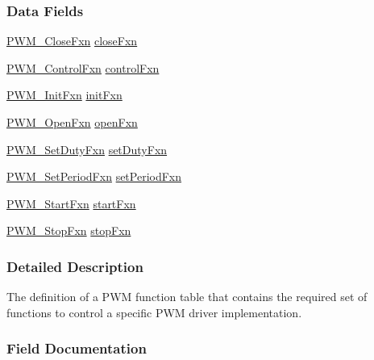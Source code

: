 \subsubsection*{Data Fields}
\begin{DoxyCompactItemize}
\item 
\hyperlink{_p_w_m_8h_a1643d365dfa900197b324ea74035d2ec}{P\+W\+M\+\_\+\+Close\+Fxn} \hyperlink{struct_p_w_m___fxn_table_a1d6e6575c66ae470f23dc2f40e54706c}{close\+Fxn}
\item 
\hyperlink{_p_w_m_8h_af538c912f876c434c62e7e0e28d41b75}{P\+W\+M\+\_\+\+Control\+Fxn} \hyperlink{struct_p_w_m___fxn_table_af96cd80b3f63291664e9268cd7a30cbc}{control\+Fxn}
\item 
\hyperlink{_p_w_m_8h_a38666ae4b117b81d35758258012b251a}{P\+W\+M\+\_\+\+Init\+Fxn} \hyperlink{struct_p_w_m___fxn_table_aebcde91c512c962f100d13f511789254}{init\+Fxn}
\item 
\hyperlink{_p_w_m_8h_a16b7b446398f8b90e4fa287c6e4a0981}{P\+W\+M\+\_\+\+Open\+Fxn} \hyperlink{struct_p_w_m___fxn_table_aca1bd99df949b2e0121ff90598279441}{open\+Fxn}
\item 
\hyperlink{_p_w_m_8h_a052016271d09bd468dddff3168dd46de}{P\+W\+M\+\_\+\+Set\+Duty\+Fxn} \hyperlink{struct_p_w_m___fxn_table_a766700e0a02097f9fd2d332b71082605}{set\+Duty\+Fxn}
\item 
\hyperlink{_p_w_m_8h_a11f62a9fd14169856c477ce2fbe17b6f}{P\+W\+M\+\_\+\+Set\+Period\+Fxn} \hyperlink{struct_p_w_m___fxn_table_a8c2294da9c53264f7096f6679316f950}{set\+Period\+Fxn}
\item 
\hyperlink{_p_w_m_8h_af0a392fb66c104f9d60e80e023dd3b89}{P\+W\+M\+\_\+\+Start\+Fxn} \hyperlink{struct_p_w_m___fxn_table_afd7e6ebdef185aac438ba871f6163fd5}{start\+Fxn}
\item 
\hyperlink{_p_w_m_8h_aff8ad682f40a810ecf03824e8e190087}{P\+W\+M\+\_\+\+Stop\+Fxn} \hyperlink{struct_p_w_m___fxn_table_a0614274c889e81ab19a24f2b076b17d3}{stop\+Fxn}
\end{DoxyCompactItemize}


\subsubsection{Detailed Description}
The definition of a P\+W\+M function table that contains the required set of functions to control a specific P\+W\+M driver implementation. 

\subsubsection{Field Documentation}
